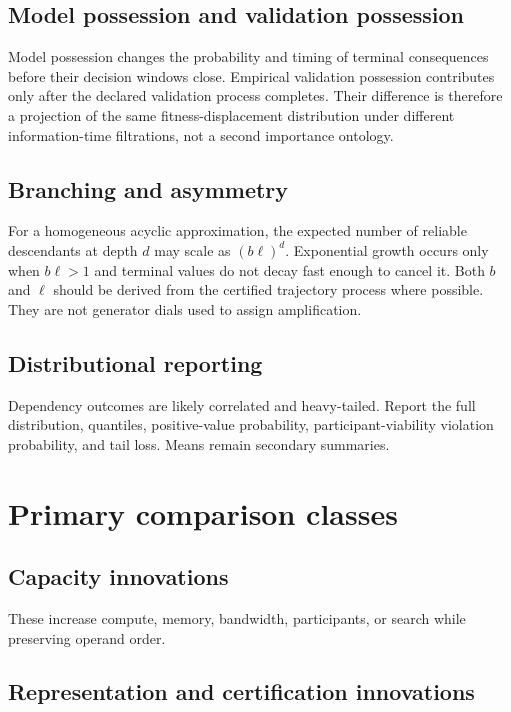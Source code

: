 \documentclass[11pt]{article}
\begin{document}
\subsection{Model possession and validation possession}

Model possession changes the probability and timing of terminal consequences before their decision windows close.
Empirical validation possession contributes only after the declared validation process completes. Their difference is
therefore a projection of the same fitness-displacement distribution under different information-time filtrations, not
a second importance ontology.

\subsection{Branching and asymmetry}

For a homogeneous acyclic approximation, the expected number of reliable descendants at depth $d$ may scale as
$(b\ell)^d$. Exponential growth occurs only when $b\ell>1$ and terminal values do not decay fast enough to cancel it.
Both $b$ and $\ell$ should be derived from the certified trajectory process where possible. They are not generator dials
used to assign amplification.

\subsection{Distributional reporting}

Dependency outcomes are likely correlated and heavy-tailed. Report the full distribution, quantiles, positive-value
probability, participant-viability violation probability, and tail loss. Means remain secondary summaries.

\section{Primary comparison classes}

\subsection{Capacity innovations}

These increase compute, memory, bandwidth, participants, or search while preserving operand order.

\subsection{Representation and certification innovations}
\end{document}
